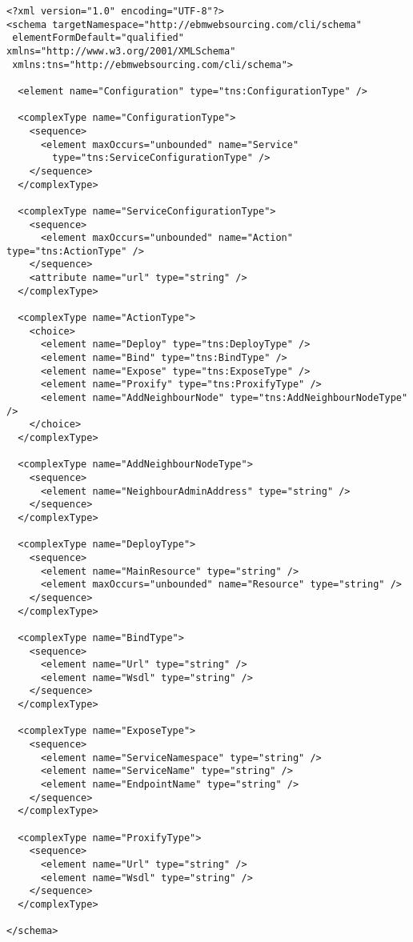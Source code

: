 {\footnotesize
\begin{lstlisting}[caption=\texttt{config.xml} schema, label=lst:config_xml_schema]
<?xml version="1.0" encoding="UTF-8"?>
<schema targetNamespace="http://ebmwebsourcing.com/cli/schema"
 elementFormDefault="qualified" xmlns="http://www.w3.org/2001/XMLSchema"
 xmlns:tns="http://ebmwebsourcing.com/cli/schema">

  <element name="Configuration" type="tns:ConfigurationType" />

  <complexType name="ConfigurationType">
    <sequence>
      <element maxOccurs="unbounded" name="Service"
        type="tns:ServiceConfigurationType" />
    </sequence>
  </complexType>

  <complexType name="ServiceConfigurationType">
    <sequence>
      <element maxOccurs="unbounded" name="Action" type="tns:ActionType" />
    </sequence>
    <attribute name="url" type="string" />
  </complexType>

  <complexType name="ActionType">
    <choice>
      <element name="Deploy" type="tns:DeployType" />
      <element name="Bind" type="tns:BindType" />
      <element name="Expose" type="tns:ExposeType" />
      <element name="Proxify" type="tns:ProxifyType" />
      <element name="AddNeighbourNode" type="tns:AddNeighbourNodeType" />
    </choice>
  </complexType>

  <complexType name="AddNeighbourNodeType">
    <sequence>
      <element name="NeighbourAdminAddress" type="string" />
    </sequence>
  </complexType>

  <complexType name="DeployType">
    <sequence>
      <element name="MainResource" type="string" />
      <element maxOccurs="unbounded" name="Resource" type="string" />
    </sequence>
  </complexType>

  <complexType name="BindType">
    <sequence>
      <element name="Url" type="string" />
      <element name="Wsdl" type="string" />
    </sequence>
  </complexType>

  <complexType name="ExposeType">
    <sequence>
      <element name="ServiceNamespace" type="string" />
      <element name="ServiceName" type="string" />
      <element name="EndpointName" type="string" />
    </sequence>
  </complexType>

  <complexType name="ProxifyType">
    <sequence>
      <element name="Url" type="string" />
      <element name="Wsdl" type="string" />
    </sequence>
  </complexType>

</schema>
\end{lstlisting}
}

